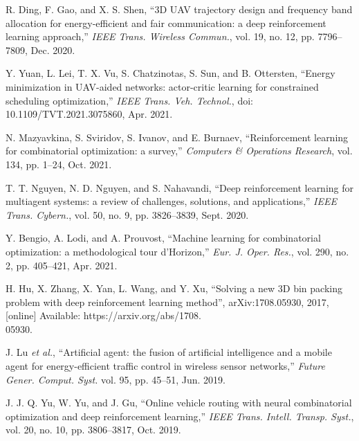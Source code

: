 \documentclass[journal]{IEEEtran}
\begin{document}
\begin{thebibliography}{1}
     {R. Ding, F. Gao, and X. S. Shen, ``3D UAV trajectory design and frequency band allocation for energy-efficient and fair communication: a deep reinforcement learning approach,'' \emph{IEEE Trans. Wireless Commun.}, vol. 19, no. 12, pp. 7796--7809, Dec. 2020.}



     {Y. Yuan, L. Lei, T. X. Vu, S. Chatzinotas, S. Sun, and B. Ottersten, ``Energy minimization in UAV-aided networks: actor-critic learning for constrained scheduling optimization,'' \emph{IEEE Trans. Veh. Technol.}, doi: 10.1109/TVT.2021.3075860, Apr. 2021.}



      {N. Mazyavkina, S. Sviridov, S. Ivanov, and E. Burnaev, ``Reinforcement learning for combinatorial optimization: a survey,'' \emph{Computers \& Operations Research}, vol. 134, pp. 1--24, Oct. 2021.}

      {T. T. Nguyen, N. D. Nguyen, and S. Nahavandi, ``Deep reinforcement learning for multiagent systems: a review of challenges, solutions, and applications,'' \emph{IEEE Trans. Cybern.}, vol. 50, no. 9, pp. 3826--3839, Sept. 2020.}


      {Y. Bengio, A. Lodi, and A. Prouvost, ``Machine learning for combinatorial optimization: a methodological tour d'Horizon,'' \emph{Eur. J. Oper. Res.}, vol. 290, no. 2, pp. 405--421, Apr. 2021.}





     {H. Hu, X. Zhang, X. Yan, L. Wang, and Y. Xu, ``Solving a new 3D bin packing problem with deep reinforcement learning method'', arXiv:1708.05930, 2017, [online] Available: https://arxiv.org/abs/1708.\\05930.}



     {J. Lu \emph{et al.}, ``Artificial agent: the fusion of artificial intelligence and a mobile agent for energy-efficient traffic control in wireless sensor networks,'' \emph{Future Gener. Comput. Syst.} vol. 95, pp. 45--51, Jun. 2019.}




     {J. J. Q. Yu, W. Yu, and J. Gu, ``Online vehicle routing with neural combinatorial optimization and deep reinforcement learning,'' \emph{IEEE Trans. Intell. Transp. Syst.}, vol. 20, no. 10, pp. 3806--3817, Oct. 2019.}



\end{thebibliography}
\end{document}
